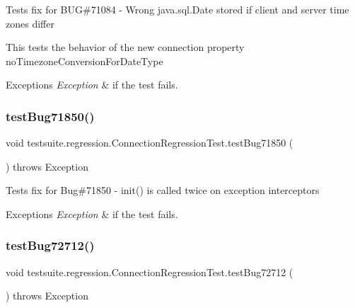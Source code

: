Tests fix for B\+UG\#71084 -\/ Wrong java.\+sql.\+Date stored if client and server time zones differ

This tests the behavior of the new connection property \textquotesingle{}no\+Timezone\+Conversion\+For\+Date\+Type\textquotesingle{}


\begin{DoxyExceptions}{Exceptions}
{\em Exception} & if the test fails. \\
\hline
\end{DoxyExceptions}
\mbox{\label{classtestsuite_1_1regression_1_1_connection_regression_test_a4b5713e8080de9926d1add37598cde58}} 
\subsubsection{\texorpdfstring{test\+Bug71850()}{testBug71850()}}
{\footnotesize\ttfamily void testsuite.\+regression.\+Connection\+Regression\+Test.\+test\+Bug71850 (\begin{DoxyParamCaption}{ }\end{DoxyParamCaption}) throws Exception}

Tests fix for Bug\#71850 -\/ init() is called twice on exception interceptors


\begin{DoxyExceptions}{Exceptions}
{\em Exception} & if the test fails. \\
\hline
\end{DoxyExceptions}
\mbox{\label{classtestsuite_1_1regression_1_1_connection_regression_test_a5b26e8f9f7cdbfaf8bb96f0f4bf42f5d}} 
\subsubsection{\texorpdfstring{test\+Bug72712()}{testBug72712()}}
{\footnotesize\ttfamily void testsuite.\+regression.\+Connection\+Regression\+Test.\+test\+Bug72712 (\begin{DoxyParamCaption}{ }\end{DoxyParamCaption}) throws Exception}

